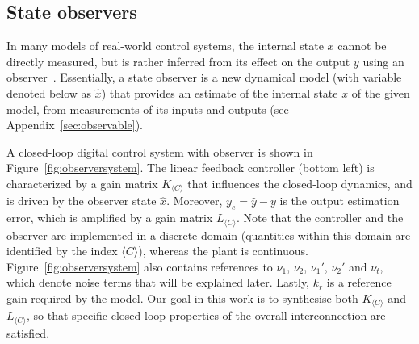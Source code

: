 \documentclass[sigconf]{llncs}
\newcommand{\mat}[1]{{#1}}
\renewcommand{\vec}[1]{{#1}}
\begin{document}
\subsection{State observers}\label{sec:observer}

In many models of real-world control systems, 
the internal state $x$ cannot be directly measured,  
but is rather inferred from its effect on the output $\vec{y}$ using an observer~\cite{Astrom08}.  
Essentially, a state observer is a new dynamical model (with variable denoted below as $\hat{\vec{x}}$) 
that provides an estimate of the internal state $x$ of the given model, 
from measurements of its inputs and outputs (see Appendix~\ref{sec:observable}). 

A closed-loop digital control system with observer is shown in Figure~\ref{fig:observersystem}. 
The linear feedback controller (bottom left) is characterized by a gain matrix $\mat{K}_{\langle C \rangle}$ that influences the closed-loop dynamics, 
and is driven by the observer state $\hat{\vec{x}}$.  
Moreover, $\vec{y}_e=\hat{\vec{y}} - \vec{y}$ is the output estimation error,  
which is amplified by a gain matrix $\mat{L}_{\langle C \rangle}$.
Note that the controller and the observer are implemented in a discrete domain 
(quantities within this domain are identified by the index $\langle C \rangle$), whereas the plant is continuous.
Figure~\ref{fig:observersystem} also contains references to $\nu_1$, $\nu_2$, $\nu_1'$, $\nu_2'$ and $\nu_t$, which
  denote noise terms that will be explained later.   
  Lastly, $k_r$ is a reference gain required by the model.  
  Our goal in this work is to synthesise both $\mat{K}_{\langle C \rangle}$ and $\mat{L}_{\langle C \rangle}$, 
  so that specific closed-loop properties of the overall interconnection are satisfied.
 
\end{document}
